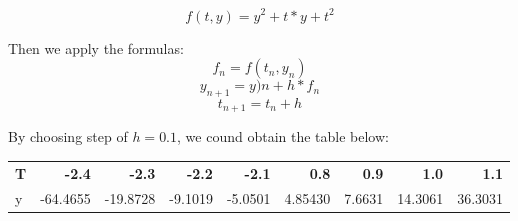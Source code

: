 \documentclass[cap,cs5size,nospace,indent,fancyhdr]{ctexart}
\begin{document}
\[f(t,y) = y^2+t*y+t^2\]

Then we apply the formulas:
\[f_n = f(t_n, y_n)\]
\[y_{n+1} = y)n + h*f_n\]
\[t_{n+1} = t_n + h\]

By choosing step of $h = 0.1$, we cound obtain the table below:
\begin{table}
	\begin{center}
		\begin{tabular}{l|r|r|r|r|r|r|r|r}
			\textbf{T} & \textbf{-2.4} & \textbf{-2.3} & \textbf{-2.2} & \textbf{-2.1} & \textbf{0.8} & \textbf{0.9} & \textbf{1.0} & \textbf{1.1} \\

			y & -64.4655 & -19.8728 & -9.1019 & -5.0501 & 4.85430 & 7.6631 & 14.3061 & 36.3031 \\
			
		\end{tabular}
	\end{center}
	
\end{table}
\end{document}
